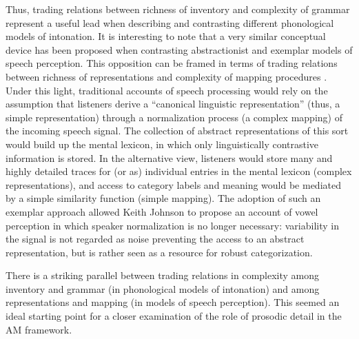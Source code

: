 Thus, trading relations between richness of inventory and complexity of grammar represent a useful lead when describing and contrasting different phonological models of intonation. It is interesting to note that a very similar conceptual device has been proposed when contrasting abstractionist and exemplar models of speech perception. This opposition can be framed in terms of trading relations between richness of representations and complexity of mapping procedures \citep{johnson1997complex}. Under this light, traditional accounts of speech processing would rely on the assumption that listeners derive a ``canonical linguistic representation'' (thus, a simple representation) through a normalization process (a complex mapping) of the incoming speech signal. The collection of abstract representations of this sort would build up the mental lexicon, in which only linguistically contrastive information is stored. In the alternative view, listeners would store many and highly detailed traces for (or as) individual entries in the mental lexicon (complex representations), and access to category labels and meaning would be mediated by a simple similarity function (simple mapping). The adoption of such an exemplar approach allowed Keith Johnson to propose an account of vowel perception \citep{johnson1997speech} in which speaker normalization is no longer necessary: variability in the signal is not regarded as noise preventing the access to an abstract representation, but is rather seen as a resource for robust categorization.

There is a striking parallel between trading relations in complexity among inventory and grammar (in phonological models of intonation) and among representations and mapping (in models of speech perception). This seemed an ideal starting point for a closer examination of the role of prosodic detail in the AM framework.

